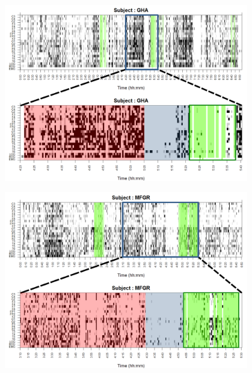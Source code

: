 \begin{figure}
\includegraphics[width=0.95\textwidth]
{./img_ejemplos/zoom_GHA.pdf}
\end{figure}


\begin{figure}
\includegraphics[width=0.95\textwidth]
{./img_ejemplos/zoom_MFGR.pdf}
\end{figure}

